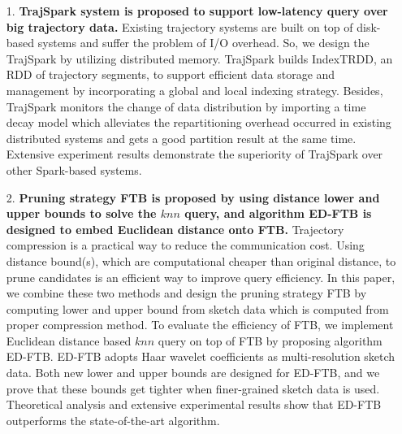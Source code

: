 \begin{itemize}
\item [1.]\textbf{TrajSpark system is proposed to support low-latency query over big trajectory data.} Existing trajectory systems are built on top of disk-based systems and suffer the problem of I/O overhead. So, we design the TrajSpark by utilizing distributed memory.
TrajSpark builds  IndexTRDD, an RDD of trajectory segments, to support efficient data storage and management by incorporating a global and local indexing strategy. 
Besides, TrajSpark monitors the change of data distribution by importing a time decay model which alleviates the repartitioning overhead occurred in existing distributed systems and gets a good partition result at the same time.  Extensive experiment results demonstrate the superiority of TrajSpark over other Spark-based systems.


\item[2.] \textbf{Pruning strategy FTB  is proposed by using  distance lower and upper bounds to  solve the $knn$ query, and  algorithm ED-FTB is designed to embed Euclidean distance onto FTB.}
Trajectory compression is a practical way to reduce the communication cost. Using distance  bound(s), which are computational cheaper than original distance, to prune candidates is an efficient way to improve query efficiency. 
In this paper, we combine these two methods and design the pruning strategy FTB by computing lower and upper bound from sketch data which is computed from proper compression method. 
To evaluate the efficiency  of FTB, we implement  Euclidean distance based $knn$ query  on top of FTB by proposing algorithm ED-FTB.
ED-FTB  adopts Haar  wavelet coefficients as multi-resolution sketch data.  Both new lower and upper bounds are designed for ED-FTB, and we prove that these bounds get tighter when finer-grained sketch data is used.   Theoretical analysis and extensive experimental results  show that ED-FTB outperforms the state-of-the-art algorithm.


\end{itemize}
